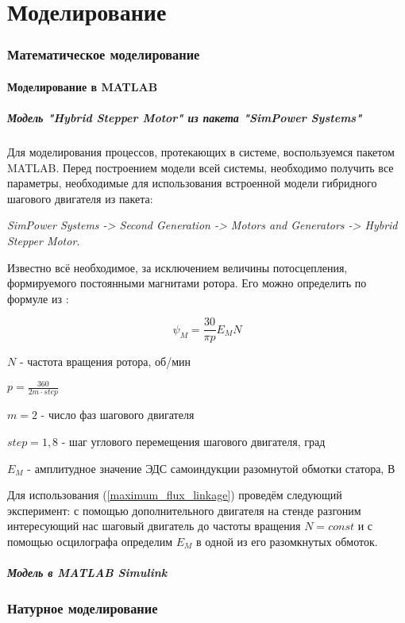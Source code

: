 \newpage
\part{Моделирование}

\section{Математическое моделирование}

\subsection{Моделирование в MATLAB}
\subsubsection{Модель "Hybrid Stepper Motor" из пакета "SimPower Systems"}

Для моделирования процессов, протекающих в системе, воспользуемся пакетом MATLAB.
Перед построением модели всей системы, необходимо получить все параметры,
необходимые для использования встроенной модели гибридного шагового двигателя из пакета:

\textit{SimPower Systems -> Second Generation -> Motors and Generators -> Hybrid Stepper Motor.}

Известно всё необходимое, за исключением величины потосцепления, формируемого
постоянными магнитами ротора. Его можно определить по формуле 
из \cite{Matlab_help_stepper_motor}:

\begin{equation}
    \label{maximum_flux_linkage}
    \psi_{M} = \frac{30}{\pi p} E_{M} N
\end{equation}

$N$ - частота вращения ротора, об/мин

$p = \frac{360}{2m \cdot step}$

$m = 2$ - число фаз шагового двигателя

$step = 1,8$ - шаг углового перемещения шагового двигателя, град

$E_{M}$ - амплитудное значение ЭДС самоиндукции разомнутой обмотки статора, В

Для использования (\ref{maximum_flux_linkage}) проведём следующий эксперимент:
с помощью дополнительного двигателя на стенде разгоним интересующий нас шаговый 
двигатель до частоты вращения $N = const$ и с помощью осцилографа определим $E_{M}$
в одной из его разомкнутых обмоток.

\subsubsection{Модель в MATLAB Simulink}


\newpage
\section{Натурное моделирование}

\endinput

